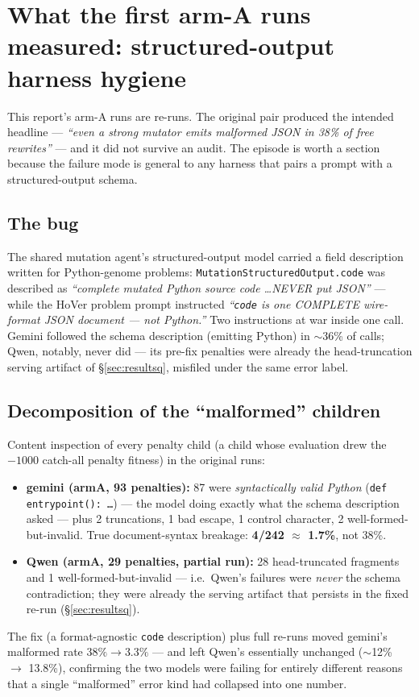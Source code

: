 \documentclass[11pt]{article}
\begin{document}
\section{What the first arm-A runs measured: structured-output harness hygiene}
\label{sec:artifact}
This report's arm-A runs are re-runs. The original pair produced the intended headline ---
\emph{``even a strong mutator emits malformed JSON in 38\% of free rewrites''} --- and it did not survive an
audit. The episode is worth a section because the failure mode is general to any harness that
pairs a prompt with a structured-output schema.

\subsection{The bug}
The shared mutation agent's structured-output model carried a field description written for
Python-genome problems: \texttt{MutationStructuredOutput.code} was described as \emph{``complete
mutated Python source code \dots NEVER put JSON''} --- while the HoVer problem prompt instructed
\emph{``\texttt{code} is one COMPLETE wire-format JSON document --- not Python.''} Two
instructions at war inside one call. Gemini followed the schema description (emitting Python) in
$\sim$36\% of calls; Qwen, notably, never did --- its pre-fix penalties were already the
head-truncation serving artifact of \S\ref{sec:resultsq}, misfiled under the same error label.

\subsection{Decomposition of the ``malformed'' children}
Content inspection of every penalty child (a child whose evaluation drew the $-1000$ catch-all
penalty fitness) in the original runs:
\begin{itemize}
  \item \textbf{gemini (armA, 93 penalties):} 87 were \emph{syntactically valid Python}
  (\texttt{def entrypoint():\,\dots}) --- the model doing exactly what the schema description
  asked --- plus 2 truncations, 1 bad escape, 1 control character, 2 well-formed-but-invalid.
  True document-syntax breakage: \textbf{4/242 $\approx$ 1.7\%}, not 38\%.
  \item \textbf{Qwen (armA, 29 penalties, partial run):} 28 head-truncated fragments and 1
  well-formed-but-invalid --- i.e.\ Qwen's failures were \emph{never} the schema contradiction;
  they were already the serving artifact that persists in the fixed re-run
  (\S\ref{sec:resultsq}).
\end{itemize}
The fix (a format-agnostic \texttt{code} description) plus full re-runs moved gemini's malformed
rate $38\% \to 3.3\%$ --- and left Qwen's essentially unchanged ($\sim$12\% $\to$ 13.8\%),
confirming the two models were failing for entirely different reasons that a single
``malformed'' error kind had collapsed into one number.
\end{document}
